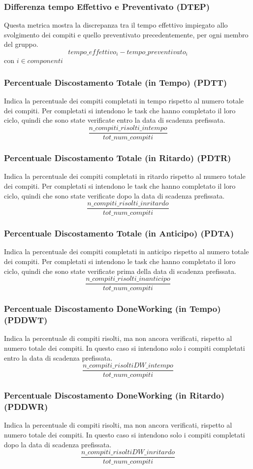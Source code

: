\subsubsection{Differenza tempo Effettivo e Preventivato (DTEP)}
Questa metrica mostra la discrepanza tra il tempo effettivo impiegato allo svolgimento dei compiti e quello preventivato precedentemente, per ogni membro del gruppo.
\[tempo\_effettivo_i - tempo\_preventivato_i\]
con $i \in {componenti}$
\subsubsection{Percentuale Discostamento Totale (in Tempo) (PDTT)}
Indica la percentuale dei compiti completati in tempo rispetto al numero totale dei compiti. Per completati si intendono le task che hanno completato il loro ciclo, quindi che sono state verificate entro la data di scadenza prefissata.
\[\frac{n\_compiti\_risolti\_intempo}{tot\_num\_compiti}\]
\subsubsection{Percentuale Discostamento Totale (in Ritardo) (PDTR)}
Indica la percentuale dei compiti completati in ritardo rispetto al numero totale dei compiti. Per completati si intendono le task che hanno completato il loro ciclo, quindi che sono state verificate dopo la data di scadenza prefissata.
\[\frac{n\_compiti\_risolti\_inritardo}{tot\_num\_compiti}\]
\subsubsection{Percentuale Discostamento Totale (in Anticipo) (PDTA)}
Indica la percentuale dei compiti completati in anticipo rispetto al numero totale dei compiti. Per completati si intendono le task che hanno completato il loro ciclo, quindi che sono state verificate prima della data di scadenza prefissata.
\[\frac{n\_compiti\_risolti\_inanticipo}{tot\_num\_compiti}\]

\subsubsection{Percentuale Discostamento DoneWorking (in Tempo) (PDDWT)}
Indica la percentuale di compiti risolti, ma non ancora verificati, rispetto al numero totale dei compiti. In questo caso si intendono solo i compiti completati entro la data di scadenza prefissata.
\[\frac{n\_compiti\_risoltiDW\_intempo}{tot\_num\_compiti}\]
\subsubsection{Percentuale Discostamento DoneWorking (in Ritardo) (PDDWR)}
Indica la percentuale di compiti risolti, ma non ancora verificati, rispetto al numero totale dei compiti. In questo caso si intendono solo i compiti completati dopo la data di scadenza prefissata.
\[\frac{n\_compiti\_risoltiDW\_inritardo}{tot\_num\_compiti}\]
